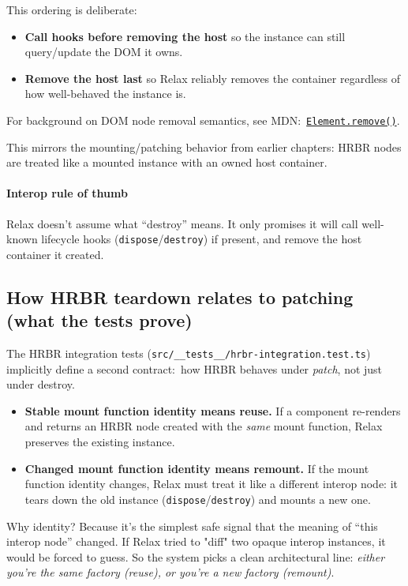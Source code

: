 This ordering is deliberate:

\begin{itemize}
  \item \textbf{Call hooks before removing the host} so the instance can still query/update the DOM it owns.
  \item \textbf{Remove the host last} so Relax reliably removes the container regardless of how well-behaved the instance is.
\end{itemize}

For background on DOM node removal semantics, see MDN:\ \href{https://developer.mozilla.org/en-US/docs/Web/API/Element/remove}{\texttt{Element.remove()}}.

This mirrors the mounting/patching behavior from earlier chapters: HRBR nodes are treated like a mounted instance with an owned host container.

\paragraph{Interop rule of thumb}

Relax doesn't assume what ``destroy'' means.
It only promises it will call well-known lifecycle hooks (\texttt{dispose}/\texttt{destroy}) if present, and remove the host container it created.

\subsection{How HRBR teardown relates to patching (what the tests prove)}

The HRBR integration tests (\texttt{src/\_\_tests\_\_/hrbr-integration.test.ts}) implicitly define a second contract:\ how HRBR behaves under \emph{patch}, not just under destroy.

\begin{itemize}
  \item \textbf{Stable mount function identity means reuse.}
    If a component re-renders and returns an HRBR node created with the \emph{same} mount function, Relax preserves the existing instance.
  \item \textbf{Changed mount function identity means remount.}
    If the mount function identity changes, Relax must treat it like a different interop node: it tears down the old instance (\texttt{dispose}/\texttt{destroy}) and mounts a new one.
\end{itemize}

Why identity? Because it's the simplest safe signal that the meaning of ``this interop node'' changed.
If Relax tried to "diff" two opaque interop instances, it would be forced to guess.
So the system picks a clean architectural line: \emph{either you're the same factory (reuse), or you're a new factory (remount)}.

